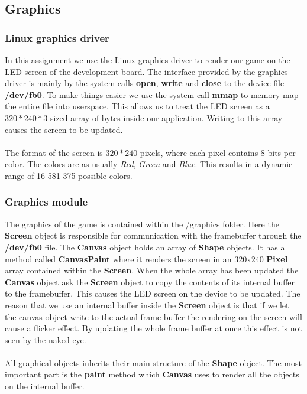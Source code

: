 \subsection{Graphics}

\subsubsection{Linux graphics driver}
In this assignment we use the Linux graphics driver to render our game on the LED screen of the
development board. The interface provided by the graphics driver is mainly by the system calls {\bf
  open}, {\bf write} and {\bf close} to the device file {\bf /dev/fb0}. To make things easier we use the
system call {\bf mmap} to memory map the entire file into userspace. This allows us to treat the LED
screen as a $320 * 240 * 3$ sized array of bytes inside our application. Writing to this array
causes the screen to be updated.\\
\\
The format of the screen is $320 * 240$ pixels, where each pixel contains 8 bits per color. The
colors are as usually {\it Red}, {\it Green} and {\it Blue}. This results in a dynamic range of 16 581
375 possible colors.

\subsubsection{Graphics module}
The graphics of the game is contained within the /graphics folder. Here the {\bf Screen} object is
responsible for communication with the framebuffer through the {\bf /dev/fb0} file. The {\bf Canvas}
object holds an array of {\bf Shape} objects. It has a method called {\bf CanvasPaint} where it
renders the screen in an 320x240 {\bf Pixel} array contained within the {\bf Screen}. When the whole
array has been updated the {\bf Canvas} object ask the {\bf Screen} object to copy the contents of
its internal buffer to the framebuffer. This causes the LED screen on the device to be updated. The
reason that we use an internal buffer inside the {\bf Screen} object is that if we let the canvas
object write to the actual frame buffer the rendering on the screen will cause a flicker effect. By
updating the whole frame buffer at once this effect is not seen by the naked eye.\\
\\
All graphical objects inherits their main structure of the {\bf Shape} object. The most important
part is the {\bf paint} method which {\bf Canvas} uses to render all the objects on the internal buffer.

